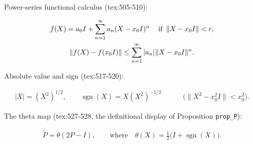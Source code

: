 \begin{defsourcequote}
\end{defsourcequote}

\hypertarget{def:theta-idempotent-approximation}{}%
\begin{definition}\label{def:theta-idempotent-approximation}
Power-series functional calculus (tex:505-510):

\begin{gather*}
f(X)=a_0I+\sum_{n=1}^{\infty}a_n(X-x_0I)^n\quad\:
\text{if }\, \|X-x_0I\|<r,\\
\|f(X)-f(x_0I)\|\le \sum_{n=1}^{\infty}|a_n|\mkern1mu\|X-x_0I\|^n.
\end{gather*}

Absolute value and sign (tex:517-520):

\begin{gather*}
|X|=(X^2)^{1/2},\qquad \operatorname{sgn}(X)=X(X^2)^{-1/2}\qquad\quad
\bigl(\|X^2-x_0^2I\|<x_0^2\bigr).
\end{gather*}

The theta map (tex:527-528, the definitional display of Proposition \texttt{prop\_P}):

\begin{gather*}
\widetilde{P}=\theta(2P-I),\qquad
\text{where}\quad \theta(X)=\frac{1}{2}\bigl(I+\operatorname{sgn}(X)\bigr).
\end{gather*}
\end{definition}

